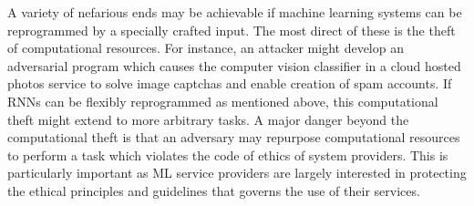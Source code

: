 \documentclass{article}
\begin{document}
A variety of nefarious ends may be achievable if machine learning systems can be reprogrammed by a specially crafted input. 
The most direct of these is the theft of computational resources. 
For instance, an attacker might develop an adversarial program which causes the computer vision classifier in a cloud hosted photos service
 to solve image captchas and enable creation of spam accounts. 
If RNNs can be flexibly reprogrammed as 
mentioned above, this computational theft might extend to more arbitrary tasks.
A major danger beyond the computational theft is that an adversary may repurpose computational resources to perform a task which violates the code of ethics of system providers. This is particularly important as ML service providers are largely interested in protecting the ethical principles and guidelines that governs the use of their services. 
\end{document}

